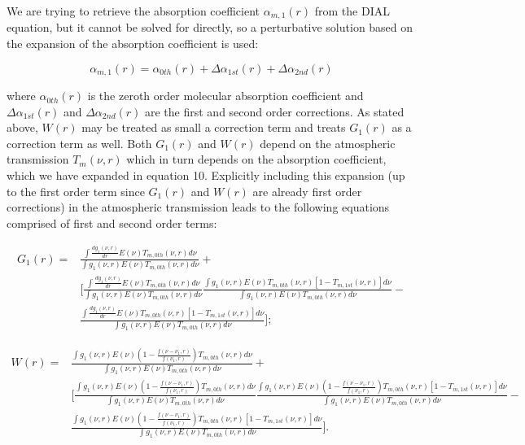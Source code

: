 \documentclass[twoside]{article}
\begin{document}
\noindent We are trying to retrieve the absorption coefficient $\alpha_{m,1}(r)$ from the DIAL equation, but it cannot be solved for directly, so a perturbative solution based on the expansion of the absorption coefficient is used:

\begin{equation}
	\alpha_{m,1}(r) = \alpha_{0th}(r) + \Delta \alpha_{1st}(r) + \Delta \alpha_{2nd}(r)
\end{equation}

\noindent where $\alpha_{0th}(r)$ is the zeroth order molecular absorption coefficient and $\Delta \alpha_{1st}(r)$ and $\Delta \alpha_{2nd}(r)$ are the first and second order corrections.
As stated above, $W(r)$ may be treated as small a correction term and \citet{Bosenberg1998} treats $G_1(r)$ as a correction term as well.
Both $G_1(r)$ and $W(r)$ depend on the atmospheric transmission $T_m(\nu,r)$ which in turn depends on the absorption coefficient, which we have expanded in equation 10.
Explicitly including this expansion (up to the first order term since $G_1(r)$ and $W(r)$ are already first order corrections) in the atmospheric transmission leads to the following equations comprised of first and second order terms:

\begin{align}
\nonumber	G_1(r) = &\frac{\int \frac{dg_1(\nu,r)}{dr} E(\nu) T_{m,0th}(\nu,r) d\nu}{\int g_1(\nu,r) E(\nu) T_{m,0th}(\nu,r) d\nu} +\\
\nonumber	 &\Bigg[ \frac{\int \frac{dg_1(\nu,r)}{dr} E(\nu) T_{m,0th}(\nu,r) d\nu}{\int g_1(\nu,r) E(\nu) T_{m,0th}(\nu,r) d\nu} \frac{\int g_1(\nu,r) E(\nu) T_{m,0th}(\nu,r) [1- T_{m,1st}(\nu,r)] d\nu}{\int g_1(\nu,r) E(\nu) T_{m,0th}(\nu,r) d\nu} -\\
	 &\frac{\int \frac{dg_1(\nu,r)}{dr} E(\nu) T_{m,0th}(\nu,r) [1- T_{m,1st}(\nu,r)] d\nu}{\int g_1(\nu,r) E(\nu) T_{m,0th}(\nu,r) d\nu} \Bigg];
\end{align}

\begin{align}
\nonumber	W(r) = &\frac{\int g_1(\nu,r) E(\nu) \left(1 - \frac{f(\nu - \nu_1,r)}{f(\nu_1,r)}\right) T_{m,0th}(\nu,r) d\nu}{\int g_1(\nu,r) E(\nu) T_{m,0th}(\nu,r) d\nu} +\\
\nonumber	 &\Bigg[ \frac{\int g_1(\nu,r) E(\nu) \left(1 - \frac{f(\nu - \nu_1,r)}{f(\nu_1,r)}\right) T_{m,0th}(\nu,r) d\nu}{\int g_1(\nu,r) E(\nu) T_{m,0th}(\nu,r) d\nu} \frac{\int g_1(\nu,r) E(\nu) \left(1 - \frac{f(\nu - \nu_1,r)}{f(\nu_1,r)}\right) T_{m,0th}(\nu,r) [1- T_{m,1st}(\nu,r)] d\nu}{\int g_1(\nu,r) E(\nu) T_{m,0th}(\nu,r) d\nu} -\\
&\frac{\int g_1(\nu,r) E(\nu) \left(1 - \frac{f(\nu - \nu_1,r)}{f(\nu_1,r)}\right) T_{m,0th}(\nu,r) [1- T_{m,1st}(\nu,r)] d\nu}{\int g_1(\nu,r) E(\nu) T_{m,0th}(\nu,r) d\nu} \Bigg].
\end{align}
\end{document}
